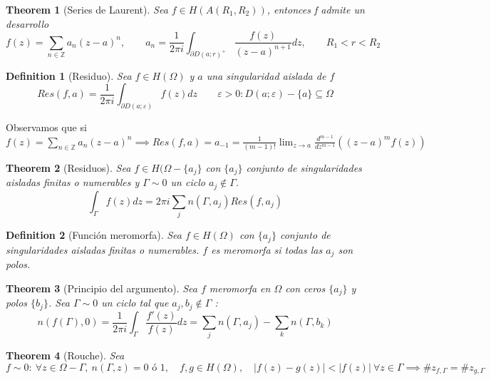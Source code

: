\documentclass[leqno]{article}
\newtheorem*{definition}{Definition}
\newtheorem*{theorem}{Theorem}
\begin{document}
\begin{theorem}[Series de Laurent]
Sea $f\in H(A(R_1, R_2))$, entonces f admite un desarrollo
\[
f(z) = \sum_{n\in \mathbb{Z}} a_n(z-a)^n, \qquad a_n = \frac{1}{2\pi i} \int_{\partial D(a;r)^+} \frac{f(z)}{(z-a)^{n+1}}dz, \qquad R_1<r<R_2
\] 
\end{theorem}

\begin{definition}[Residuo]
Sea $f\in H(\Omega)$ y $a$ una singularidad aislada de $f$ 
\[
Res(f, a) = \frac{1}{2\pi i}\int_{\partial D(a; \varepsilon) } f(z)dz \qquad \varepsilon >0 : D(a;\varepsilon )-\{a\} \subseteq \Omega
\] 
\end{definition}
Observamos que si $\displaystyle  f(z) = \sum_{n\in \mathbb{Z}} a_n(z-a)^n  \implies Res(f, a) = a_{-1} =  \frac{1}{(m-1)!} \lim_{z\to a} \frac{d^{m-1}}{dz^{m-1}}\left((z-a)^mf(z)\right)$ 

\begin{theorem}[Residuos]
Sea $f\in H(\Omega-\{a_j\}$ con $\{a_j\}$ conjunto de singularidades aisladas finitas o numerables y $\Gamma \sim 0$ un ciclo  $a_j\not\in \Gamma$.
\[
\int_\Gamma f(z)dz = 2\pi i \sum_j n(\Gamma, a_j)Res(f, a_j)
\] 
\end{theorem}

\begin{definition}[Función meromorfa]
Sea $f\in H(\Omega)$ con $\{a_j\}$ conjunto de singularidades aisladas finitas o numerables.  $f$ es meromorfa si todas las $a_j$ son polos.
\end{definition}

\begin{theorem}[Principio del argumento]
Sea $f$ meromorfa en $\Omega$ con ceros $\{a_j\}$ y polos  $\{b_j\}$. Sea $\Gamma \sim 0$ un ciclo tal que $a_j, b_j \not \in \Gamma $ :
\[
n(f(\Gamma ), 0) = \frac{1}{2\pi i} \int_\Gamma \frac{f'(z)}{f(z)}dz = \sum_j n(\Gamma , a_j) - \sum_k n(\Gamma , b_k)
\]
\end{theorem}

\begin{theorem}[Rouche]
Sea $f\sim 0: \ \forall z\in \Omega -\Gamma , \ n(\Gamma , z)= 0 \text{ ó } 1, \quad f, g \in H(\Omega ), \quad |f(z)-g(z)|< |f(z)| \ \forall z\in \Gamma  \implies \#z_{f, \Gamma } = \#z_{g, \Gamma }$

\end{theorem}
\end{document}
